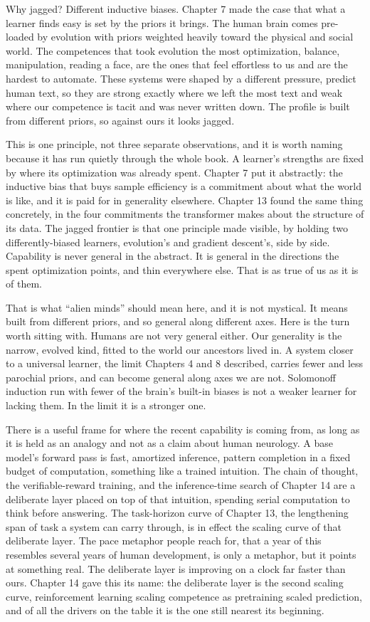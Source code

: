 Why jagged? Different inductive biases. Chapter 7 made the case that what a learner finds easy is set by the priors it brings. The human brain comes pre-loaded by evolution with priors weighted heavily toward the physical and social world. The competences that took evolution the most optimization, balance, manipulation, reading a face, are the ones that feel effortless to us and are the hardest to automate. These systems were shaped by a different pressure, predict human text, so they are strong exactly where we left the most text and weak where our competence is tacit and was never written down. The profile is built from different priors, so against ours it looks jagged.

This is one principle, not three separate observations, and it is worth naming because it has run quietly through the whole book. A learner's strengths are fixed by where its optimization was already spent. Chapter 7 put it abstractly: the inductive bias that buys sample efficiency is a commitment about what the world is like, and it is paid for in generality elsewhere. Chapter 13 found the same thing concretely, in the four commitments the transformer makes about the structure of its data. The jagged frontier is that one principle made visible, by holding two differently-biased learners, evolution's and gradient descent's, side by side. Capability is never general in the abstract. It is general in the directions the spent optimization points, and thin everywhere else. That is as true of us as it is of them.

That is what ``alien minds'' should mean here, and it is not mystical. It means built from different priors, and so general along different axes. Here is the turn worth sitting with. Humans are not very general either. Our generality is the narrow, evolved kind, fitted to the world our ancestors lived in. A system closer to a universal learner, the limit Chapters 4 and 8 described, carries fewer and less parochial priors, and can become general along axes we are not. Solomonoff induction run with fewer of the brain's built-in biases is not a weaker learner for lacking them. In the limit it is a stronger one.

There is a useful frame for where the recent capability is coming from, as long as it is held as an analogy and not as a claim about human neurology. A base model's forward pass is fast, amortized inference, pattern completion in a fixed budget of computation, something like a trained intuition. The chain of thought, the verifiable-reward training, and the inference-time search of Chapter 14 are a deliberate layer placed on top of that intuition, spending serial computation to think before answering. The task-horizon curve of Chapter 13, the lengthening span of task a system can carry through, is in effect the scaling curve of that deliberate layer. The pace metaphor people reach for, that a year of this resembles several years of human development, is only a metaphor, but it points at something real. The deliberate layer is improving on a clock far faster than ours. Chapter 14 gave this its name: the deliberate layer is the second scaling curve, reinforcement learning scaling competence as pretraining scaled prediction, and of all the drivers on the table it is the one still nearest its beginning.

